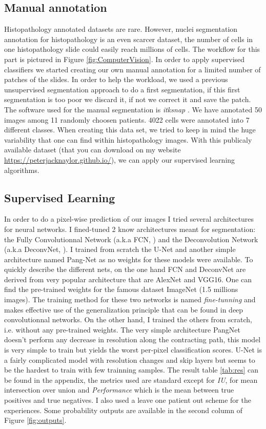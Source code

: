 \documentclass[a4paper,10pt,twocolumn]{article}
\begin{document}
\subsection{Manual annotation}
Histopathology annotated datasets are rare.
However, nuclei segmentation annotation for histopathology is an even scarcer dataset, the number of
 cells in one histopathology slide could easily reach millions of cells. The workflow for this part is
 pictured in Figure \ref{fig:ComputerVision}. In order to apply supervised classifiers we started
 creating our own manual annotation for a limited number of patches of the slides. In order to 
 help the workload, we used a previous unsupervised segmentation approach to do a first 
 segmentation, if this first segmentation is too poor we discard it, if not we correct it and save 
 the patch. The software used for the manual segmentation is \textit{itksnap} \citep{py06nimg}. We have annotated 50 
 images among 11 randomly choosen patients. 4022 cells were annotated into 7 different classes. When 
 creating this data set, we tried to keep in mind the huge variability that one can find within 
 histopathology images. With this publicaly available dataset (that you can download on my website 
 \url{https://peterjacknaylor.github.io/}), we can apply our supervised learning algorithms. 
 
\subsection{Supervised Learning} 
 In order to do a pixel-wise prediction of our images I tried several architectures for neural networks.
 I fined-tuned 2 know architectures meant for segmentation: the Fully Convolutionnal Network (a.k.a FCN, 
 \citep{long2015fcn}) and the Deconvolution Network (a.k.a DeconvNet, \citep{noh2015learning}).
I trained  from scratch the U-Net \citep{UNet} and another simple architecture named Pang-Net \citep{pang2010cell} as 
 no weights for these models were available.
 To quickly describe the different nets, on the one hand FCN and 
 DeconvNet are 
 derived from very popular architecture that are AlexNet and VGG16. One can find the pre-trained 
 weights for the famous dataset ImageNet (1.5 millions images). The training method for these two networks is named 
 \textit{fine-tunning} and makes effective use of the generalization principle that can be found in deep 
 convolutionnal networks. On the other hand, I trained the others from scratch, i.e. without any pre-trained weights. 
 The very simple architecture PangNet \citep{pang2010cell} doesn't 
 perform any decrease in resolution along the contracting path, this model is very simple to train but yields 
 the worst per-pixel classification scores. U-Net is a fairly complicated model with resolution changes and 
 skip layers but seems to be the hardest to train with few trainning samples. The result table \ref{tab:res} can be found 
 in the appendix, the metrics used are standard except for \textit{IU}, for mean intersection 
 over union and  \textit{Performance} which is the mean between true positives and true negatives. I also used a leave one patient out scheme for the experiences. Some probability outputs are available in the second column of Figure \ref{fig:outputs}. 
\end{document}
